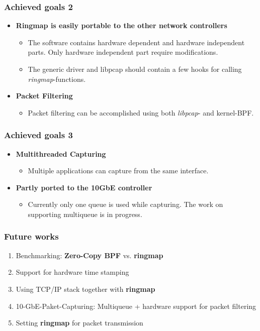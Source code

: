 \documentclass{beamer}
\begin{document}
\begin{frame}
\frametitle{Achieved goals 2}
\begin{itemize}
	\item \textbf{Ringmap is easily portable to the other network controllers}
		\begin{itemize}
			\item The software contains hardware dependent and hardware
				independent parts. Only hardware independent part require
				modifications.
			\item The generic driver and libpcap should contain a few hooks for calling
				\emph{ringmap}-functions.
		\end{itemize}
	\item \textbf{Packet Filtering}
		\begin{itemize}
			\item Packet filtering can be accomplished using both
				\emph{libpcap}- and kernel-BPF.
		\end{itemize}
\end{itemize}
\end{frame}
\begin{frame}
\frametitle{Achieved goals 3}
\begin{itemize}
	\item \textbf{Multithreaded Capturing}
		\begin{itemize}
			\item Multiple applications can capture from the same interface. 
		\end{itemize}
	\item \textbf{Partly ported to the 10GbE controller}
		\begin{itemize}
			\item Currently only one queue is used while capturing. The work on
				supporting multiqueue is in progress.
		\end{itemize}
\end{itemize}
\end{frame}
\begin{frame}
\frametitle{Future works}
\begin{enumerate}
	\item Benchmarking:  \textbf{Zero-Copy BPF} vs. \textbf{ringmap}
	\item Support for hardware time stamping
	\item Using TCP/IP stack together with \textbf{ringmap}
	\item 10-GbE-Paket-Capturing: Multiqueue + hardware support for packet filtering 
	\item Setting \textbf{ringmap} for packet transmission 
\end{enumerate}
\end{frame}
\end{document}

